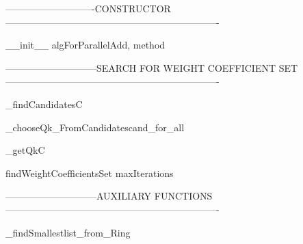 ----------------------------CONSTRUCTOR-------------------------------------------------------------------

\begin{method}{\_\_init\_\_}{ algForParallelAdd, method}

\end{method}

-----------------------------SEARCH FOR WEIGHT COEFFICIENT SET-------------------------------------------------------------------

\begin{method}{\_findCandidates}{C}

\end{method}


\begin{method}{\_chooseQk\_FromCandidates}{cand\_for\_all}

\end{method}


\begin{method}{\_getQk}{C}

\end{method}


\begin{method}{findWeightCoefficientsSet}{ maxIterations}

\end{method}


-----------------------------AUXILIARY FUNCTIONS-------------------------------------------------------------------

\begin{method}{\_findSmallest}{list\_from\_Ring}

\end{method}
